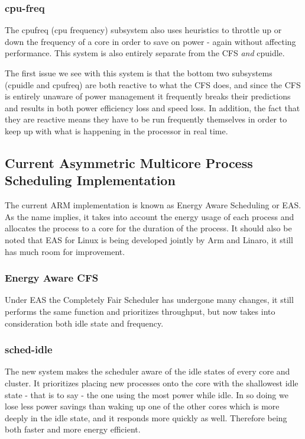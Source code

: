 \subsubsection{cpu-freq}
The cpufreq (cpu frequency) subsystem also uses heuristics to throttle up or down the frequency of a core in order to save on power - again without affecting performance. This system is also entirely separate from the CFS \textit{and} cpuidle.

The first issue we see with this system is that the bottom two subsystems (cpuidle and cpufreq) are both reactive to what the CFS does, and since the CFS is entirely unaware of power management it frequently breaks their predictions and results in both power efficiency loss and speed loss. In addition, the fact that they are reactive means they have to be run frequently themselves in order to keep up with what is happening in the processor in real time.

\subsection{Current Asymmetric Multicore Process Scheduling Implementation}
The current ARM implementation is known as Energy Aware Scheduling or EAS. As the name implies, it takes into account the energy usage of each process and allocates the process to a core for the duration of the process. It should also be noted that EAS for Linux is being developed jointly by Arm and Linaro, it still has much room for improvement.

\subsubsection{Energy Aware CFS}
Under EAS the Completely Fair Scheduler has undergone many changes, it still performs the same function and prioritizes throughput, but now takes into consideration both idle state and frequency. 

\subsubsection{sched-idle}
The new system makes the scheduler aware of the idle states of every core and cluster. It prioritizes placing new processes onto the core with the shallowest idle state - that is to say - the one using the most power while idle. In so doing we lose less power savings than waking up one of the other cores which is more deeply in the idle state, and it responds more quickly as well. Therefore being both faster and more energy efficient.
